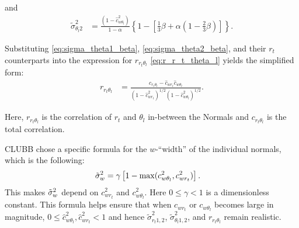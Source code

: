 and
\begin{align}
    \label{eq:sigma_theta2_beta}
    \tilde{\sigma}_{\theta_l 2}^2
    &= \frac{\left(1 - \widehat{c}_{w \theta_l}^2\right)} {1 - \alpha} \left\{1 - \left[\frac{1}{3}\beta + \alpha \left(1 - \frac{2}{3} \beta \right)\right]\right\}.
\end{align}

Substituting \cref{eq:sigma_theta1_beta}, \cref{eq:sigma_theta2_beta}, and their $r_t$ counterparts into the expression for $r_{r_t \theta_l}$ \cref{eq:r_r_t_theta_l} yields the simplified form:
\begin{align}
    \label{eq:r_r_t_theta_l_beta}
    r_{r_t \theta_l}
    &= \frac{c_{r_t \theta_l} - \widehat{c}_{w r_t} \widehat{c}_{w \theta_l}}{\left(1 - \widehat{c}_{w r_t}^2\right)^{1/2} \left(1 - \widehat{c}_{w \theta_l}^2\right)^{1/2}}.
\end{align}

Here, $r_{r_t \theta_l}$ is the correlation of $r_t$ and $\theta_l$ in-between the Normals and $c_{r_t \theta_l}$ is the total correlation.

\gls{CLUBB} chose a specific formula for the $w$-\enquote{width} of the individual normals,
which is the following:
\begin{align}
    \label{eq:sigma_tilde_w_restricted}
    {\tilde{\sigma}_w}^2
    &= \gamma \left[1 - \max(c_{w \theta_l}^2, c_{w r_t}^2) \right].
\end{align}
This makes ${\tilde{\sigma}_w}^2$ depend on $c_{w r_t}^2$ and $c_{w \theta_l}^2$.
Here $0 \leq \gamma < 1$ is a dimensionless constant.
This formula helps ensure that when $c_{w r_t}$ or $c_{w \theta_l}$ becomes large in magnitude, $0 \leq \widehat{c}_{w \theta_l}^2, \widehat{c}_{w r_t}^2 < 1$ and hence $\tilde{\sigma}_{r_t 1,2}^2$, $\tilde{\sigma}_{\theta_l 1,2}^2$, and $r_{r_t \theta_l}$ remain realistic.